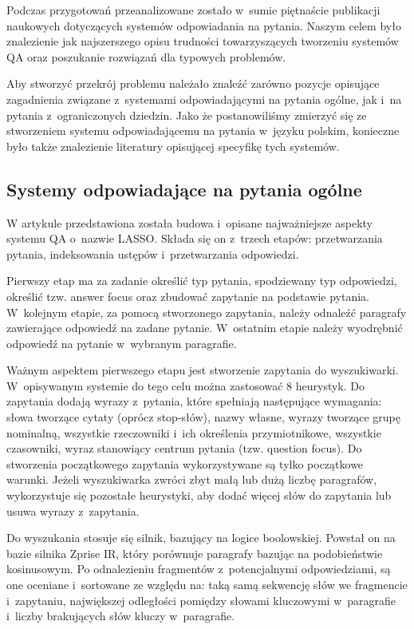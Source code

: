 
Podczas przygotowań przeanalizowane zostało w~sumie piętnaście publikacji naukowych dotyczących systemów odpowiadania na pytania. Naszym celem było znalezienie jak najszerszego opisu trudności towarzyszących tworzeniu systemów QA oraz poszukanie rozwiązań dla typowych problemów. 

Aby stworzyć przekrój problemu należało znaleźć zarówno pozycje opisujące zagadnienia związane z~systemami odpowiadającymi na pytania ogólne, jak i~na pytania z~ograniczonych dziedzin. Jako że postanowiliśmy zmierzyć się ze stworzeniem systemu odpowiadającemu na pytania w~języku polskim, konieczne było także znalezienie literatury opisującej specyfikę tych systemów.

\subsection{Systemy odpowiadające na pytania ogólne}\label{subsec:lit:op}

W artykule \cite{moldovan-etal-2000-structure} przedstawiona została budowa i~opisane najważniejsze aspekty systemu QA o~nazwie LASSO. Składa się on z~trzech etapów: przetwarzania pytania, indeksowania ustępów i~przetwarzania odpowiedzi. 

Pierwszy etap ma za zadanie określić typ pytania, spodziewany typ odpowiedzi, określić tzw. answer focus oraz zbudować zapytanie na podstawie pytania. W~kolejnym etapie, za pomocą stworzonego zapytania,  należy odnaleźć paragrafy zawierające odpowiedź na zadane pytanie. W~ostatnim etapie należy wyodrębnić odpowiedź na pytanie w~wybranym paragrafie.

Ważnym aspektem pierwszego etapu jest stworzenie zapytania do wyszukiwarki. W~opisywanym systemie do tego celu można zastosować 8 heurystyk. Do zapytania dodają wyrazy z~pytania, które spełniają następujące wymagania: słowa tworzące cytaty (oprócz stop-słów), nazwy własne, wyrazy tworzące grupę nominalną, wszystkie rzeczowniki i~ich określenia przymiotnikowe, wszystkie czasowniki, wyraz stanowiący centrum pytania (tzw. question focus). Do stworzenia początkowego zapytania wykorzystywane są tylko początkowe warunki. Jeżeli wyszukiwarka zwróci zbyt małą lub dużą liczbę paragrafów, wykorzystuje się pozostałe heurystyki, aby dodać więcej słów do zapytania lub usuwa wyrazy z~zapytania. 

Do wyszukania stosuje się silnik, bazujący na logice boolowskiej.  Powstał on na bazie silnika Zprise IR, który porównuje paragrafy bazując na podobieństwie kosinusowym. Po odnalezieniu fragmentów z~potencjalnymi odpowiedziami, są one oceniane i~sortowane ze względu na: taką samą sekwencję słów we fragmencie i~zapytaniu, największej odległości pomiędzy słowami kluczowymi w~paragrafie i~liczby brakujących słów kluczy w~paragrafie. 

